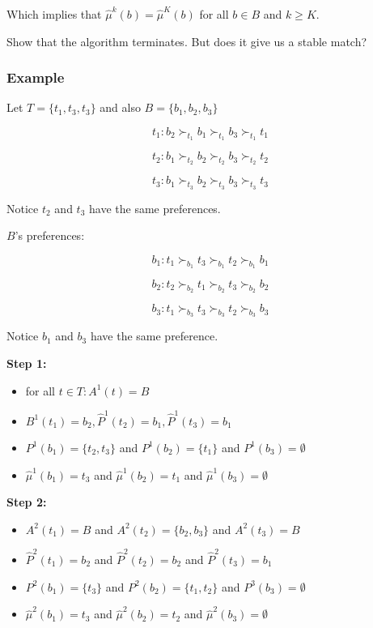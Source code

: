 \documentclass[11pt]{article}
\providecommand{\tightlist}{%
      \setlength{\itemsep}{0pt}\setlength{\parskip}{0pt}}
\begin{document}
Which implies that \(\hat{\mu}^k(b) = \hat{\mu}^K(b)\) for all
\(b \in B\) and \(k \ge K\).

Show that the algorithm terminates. But does it give us a stable match?

    \subsubsection{Example}\label{example}

Let \(T = \{t_1, t_3, t_3\}\) and also \(B = \{b_1, b_2, b_3\}\)

\[t_1: b_2 \succ_{t_1} b_1 \succ_{t_1} b_3 \succ_{t_1} t_1\]

    \[t_2: b_1 \succ_{t_2} b_2 \succ_{t_2} b_3 \succ_{t_2} t_2\]

    \[t_3: b_1 \succ_{t_3} b_2 \succ_{t_3} b_3 \succ_{t_3} t_3\]

Notice \(t_2\) and \(t_3\) have the same preferences.

\(B\)'s preferences:

\[b_1: t_1 \succ_{b_1} t_3 \succ_{b_1} t_2 \succ_{b_1} b_1\]

    \[b_2: t_2 \succ_{b_2} t_1 \succ_{b_2} t_3 \succ_{b_2} b_2\]

    \[b_3: t_1 \succ_{b_3} t_3 \succ_{b_3} t_2 \succ_{b_3} b_3\]

Notice \(b_1\) and \(b_3\) have the same preference.

    \textbf{Step 1:}

\begin{itemize}
\tightlist
\item
  for all \(t \in T: A^1(t) = B\)
\item
  \(B^1(t_1) = b_2, \hat{P}^1(t_2) = b_1, \hat{P}^1(t_3) = b_1\)
\item
  \(P^1(b_1) = \{t_2, t_3\}\) and \(P^1(b_2) = \{t_1\}\) and
  \(P^1(b_3) = \emptyset\)
\item
  \(\hat{\mu}^1(b_1) = t_3\) and \(\hat{\mu}^1(b_2) = t_1\) and
  \(\hat{\mu}^1(b_3) = \emptyset\)
\end{itemize}

\textbf{Step 2:}

\begin{itemize}
\tightlist
\item
  \(A^2(t_1) = B\) and \(A^2(t_2) = \{b_2, b_3\}\) and \(A^2(t_3) = B\)
\item
  \(\hat{P}^2(t_1) = b_2\) and \(\hat{P}^2(t_2) = b_2\) and
  \(\hat{P}^2(t_3) = b_1\)
\item
  \(P^2(b_1) = \{t_3\}\) and \(P^2(b_2) = \{t_1, t_2\}\) and
  \(P^3(b_3) = \emptyset\)
\item
  \(\hat{\mu}^2(b_1) = t_3\) and \(\hat{\mu}^2(b_2) = t_2\) and
  \(\hat{\mu}^2(b_3) = \emptyset\)
\end{itemize}
\end{document}
